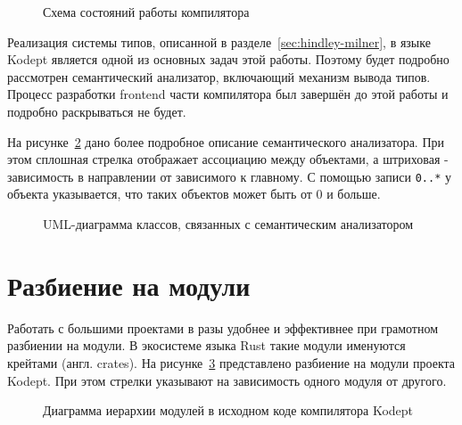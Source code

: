 \begin{figure}[H]
    \centering
    
    \caption{Схема состояний работы компилятора}
    \label{fig:pipeline}
\end{figure}

Реализация системы типов, описанной в разделе~\ref{sec:hindley-milner}, в языке Kodept является одной из основных задач этой работы.
Поэтому будет подробно рассмотрен семантический анализатор, включающий механизм вывода типов.
Процесс разработки frontend части компилятора был завершён до этой работы и подробно раскрываться не будет.

На рисунке~\ref{fig:semantic_classes} дано более подробное описание семантического анализатора.
При этом сплошная стрелка отображает ассоциацию между объектами, а штриховая - зависимость в направлении от зависимого к главному.
С помощью записи \lstinline{0..*} у объекта указывается, что таких объектов может быть от 0 и больше.

\begin{figure}[h]
    \centering
    
    \caption{UML-диаграмма классов, связанных с семантическим анализатором}
    \label{fig:semantic_classes}
\end{figure}


\section{Разбиение на модули}
\label{sec:modules}

Работать с большими проектами в разы удобнее и эффективнее при грамотном разбиении на модули.
В экосистеме языка Rust такие модули именуются крейтами (англ. crates).
На рисунке~\ref{fig:modules} представлено разбиение на модули проекта Kodept.
При этом стрелки указывают на зависимость одного модуля от другого.

\begin{figure}[H]
    \centering
    
    \caption{Диаграмма иерархии модулей в исходном коде компилятора Kodept}
    \label{fig:modules}
\end{figure}

